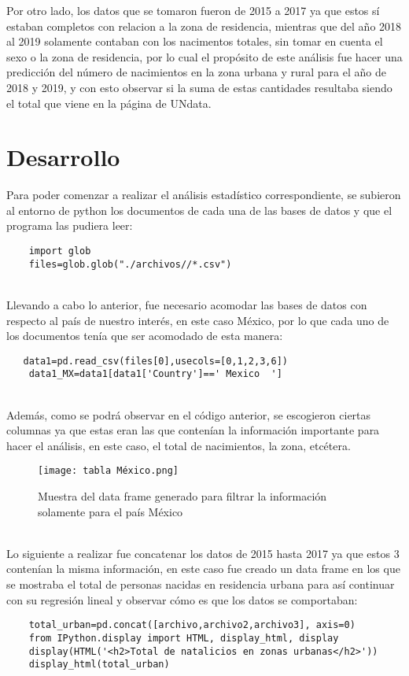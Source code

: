 \documentclass{article}
\begin{document}
\noindent Por otro lado, los datos que se tomaron fueron de 2015 a 2017 ya que estos sí estaban completos con relacion a la zona de residencia, mientras que del año 2018 al 2019 solamente contaban con los nacimentos totales, sin tomar en cuenta el sexo o la zona de residencia, por lo cual el propósito de este análisis fue hacer una predicción del número de nacimientos en la zona urbana y rural para el año de 2018 y 2019, y con esto observar si la suma de estas cantidades resultaba siendo el total que viene en la página de UNdata.


\section{Desarrollo}

\parindent Para poder comenzar a realizar el análisis estadístico correspondiente, se subieron al entorno de python los documentos de cada una de las bases de datos y que el programa las pudiera leer: 
\begin{lstlisting}
    import glob
    files=glob.glob("./archivos//*.csv")
\end{lstlisting}\\

\noindent Llevando a cabo lo anterior, fue necesario acomodar las bases de datos con respecto al país de nuestro interés, en este caso México, por lo que cada uno de los documentos tenía que ser acomodado de esta manera:
\begin{lstlisting}
   data1=pd.read_csv(files[0],usecols=[0,1,2,3,6])
    data1_MX=data1[data1['Country']==' Mexico  ']
\end{lstlisting}\\
Además, como se podrá observar en el código anterior, se escogieron ciertas columnas ya que estas eran las que contenían la información importante para hacer el análisis, en este caso, el total de nacimientos, la zona, etcétera.

\begin{figure}[h]
    \centering
    \texttt{[image: tabla México.png]}
    \caption{Muestra del data frame generado para filtrar la información solamente para el país México}
    \label{fig:my_label}
\end{figure}\\

\noindent Lo siguiente a realizar fue concatenar los datos de 2015 hasta 2017 ya que estos 3 contenían la misma información, en este caso fue creado un data frame en los que se mostraba el total de personas nacidas en residencia urbana para así continuar con su regresión lineal y observar cómo es que los datos se comportaban: 
\begin{lstlisting}
    total_urban=pd.concat([archivo,archivo2,archivo3], axis=0)
    from IPython.display import HTML, display_html, display
    display(HTML('<h2>Total de natalicios en zonas urbanas</h2>'))
    display_html(total_urban)
\end{lstlisting}\\
\end{document}
